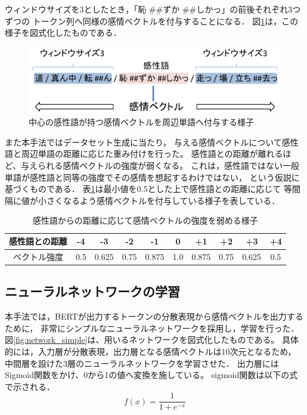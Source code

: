 			ウィンドウサイズを3としたとき，「恥 \#\#ずか \#\#しかっ」の前後それぞれ3つずつの
			トークン列へ同様の感情ベクトルを付与することになる．
			図\ref{fig:make_dataset_window}は，この様子を図式化したものである．
			\begin{figure}[H]
				\centering
				\includegraphics[width=\linewidth]{./figure/dataset_make_window.png}
				\caption{中心の感性語が持つ感情ベクトルを周辺単語へ付与する様子}
				\label{fig:make_dataset_window}
			\end{figure}


			また本手法ではデータセット生成に当たり，
			与える感情ベクトルについて感性語と周辺単語の距離に応じた重み付けを行った。
			感性語との距離が離れるほど、与えられる感情ベクトルの強度が弱くなる。
			これは，感性語ではない一般単語が感性語と同等の強度でその感情を想起するわけではない，
			という仮説に基づくものである．
			表\ref{table:vector_weaken}は最小値を0.5とした上で感性語との距離に応じて
			等間隔に値が小さくなるよう感情ベクトルを付与している様子を表している．
			\begin{table}[H]
				\centering
				\caption{感性語からの距離に応じて感情ベクトルの強度を弱める様子}
				\label{table:vector_weaken}
					\begin{tabular}{cccccccccc}
						\hline
						感性語との距離 & -4 & -3 & -2 & -1 & 0 & +1 & +2 & +3 & +4 \\
						\hline
						ベクトル強度 & 0.5 & 0.625 & 0.75 & 0.875 & 1.0 & 0.875 & 0.75 & 0.625 & 0.5 \\
						\hline
					\end{tabular}
			\end{table}

		\subsection{ニューラルネットワークの学習}
			本手法では，BERTが出力するトークンの分散表現から感情ベクトルを出力するために，
			非常にシンプルなニューラルネットワークを採用し，学習を行った．
			図\ref{fig:network_simple}は、用いるネットワークを図式化したものである。
			具体的には，入力層が分散表現，出力層となる感情ベクトルは10次元となるため，
			中間層を設けた3層のニューラルネットワークを学習させた．
			出力層にはSigmoid関数をかけ、0から1の値へ変換を施している。
			sigmoid関数は以下の式で示される．
			\begin{equation}
				f(x)=\frac{1}{1+e^{-x}}
			\end{equation}

